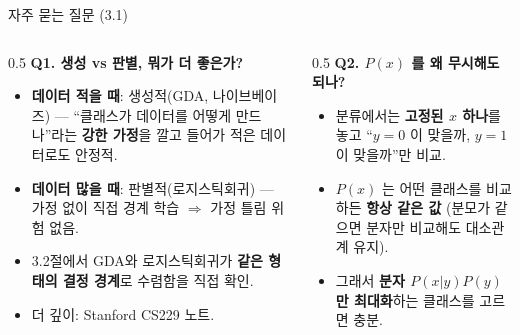 \begin{frame}{자주 묻는 질문 (3.1)}
  \begin{columns}[T]
    \begin{column}{0.5\textwidth}
      \textbf{Q1. 생성 vs 판별, 뭐가 더 좋은가?}
      \begin{itemize}
        \item \textbf{데이터 적을 때}: 생성적(GDA, 나이브베이즈) ---
          ``클래스가 데이터를 어떻게 만드나''라는 \textbf{강한 가정}을
          깔고 들어가 적은 데이터로도 안정적.
        \item \textbf{데이터 많을 때}: 판별적(로지스틱회귀) ---
          가정 없이 직접 경계 학습 $\Rightarrow$ 가정 틀림 위험 없음.
        \item 3.2절에서 GDA와 로지스틱회귀가 \textbf{같은 형태의
          결정 경계}로 수렴함을 직접 확인.
        \item 더 깊이: Stanford CS229 노트.
      \end{itemize}
    \end{column}
    \begin{column}{0.5\textwidth}
      \textbf{Q2. $P(x)$ 를 왜 무시해도 되나?}
      \begin{itemize}
        \item 분류에서는 \textbf{고정된 $x$ 하나}를 놓고
          ``$y=0$ 이 맞을까, $y=1$ 이 맞을까''만 비교.
        \item $P(x)$ 는 어떤 클래스를 비교하든 \textbf{항상 같은 값}
          (분모가 같으면 분자만 비교해도 대소관계 유지).
        \item 그래서 \textbf{분자 $P(x|y)P(y)$ 만 최대화}하는 클래스를
          고르면 충분.
      \end{itemize}
    \end{column}
  \end{columns}
\end{frame}
